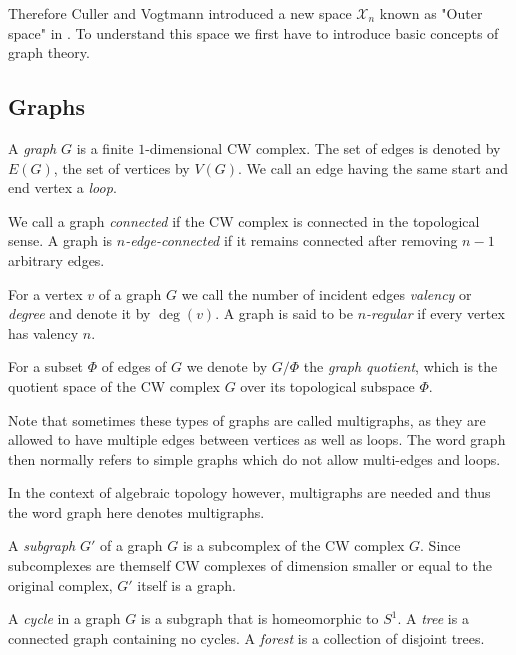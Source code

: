 Therefore Culler and Vogtmann introduced a new space $\mathcal{X}_{n}$ known as "Outer space" in \cite{vogtmann86}.
To understand this space we first have to introduce basic concepts of graph theory.

\subsection{Graphs}
\begin{definition}
	A \emph{graph} $G$ is a finite $1$-dimensional CW complex. The set of edges is denoted by $E(G)$, the set of vertices by  $V(G)$.
	We call an edge having the same start and end vertex a \emph{loop}.

	We call a graph \emph{connected} if the CW complex is connected in the topological sense.
	A graph is \emph{$n$-edge-connected} if it remains connected after removing  $n-1$ arbitrary edges.

	For a vertex $v$ of a graph  $G$ we call the number of incident edges \emph{valency} or \emph{degree} and denote it by $\deg(v)$.
	A graph is said to be \emph{$n$-regular} if every vertex has valency $n$.

	For a subset $\Phi$ of edges of $G$ we denote by $G / \Phi$ the \emph{graph quotient}, which is the quotient space of the CW complex $G$ over its topological subspace $\Phi$.
\end{definition}

\begin{remark}
	Note that sometimes these types of graphs are called multigraphs, as they are allowed to have multiple edges between vertices as well as loops.
	The word graph then normally refers to simple graphs which do not allow multi-edges and loops.

	In the context of algebraic topology however, multigraphs are needed and thus the word graph here denotes multigraphs.
\end{remark}

\begin{definition}
	A \emph{subgraph} $G'$ of a graph $G$ is a subcomplex of the CW complex $G$. Since subcomplexes are themself CW complexes of dimension smaller or equal to the original complex,
	 $G'$ itself is a graph.

	 A \emph{cycle} in a graph $G$ is a subgraph that is homeomorphic to $S^1$. A \emph{tree} is a
	 connected graph containing no cycles. A \emph{forest} is a collection of disjoint trees.
\end{definition}

